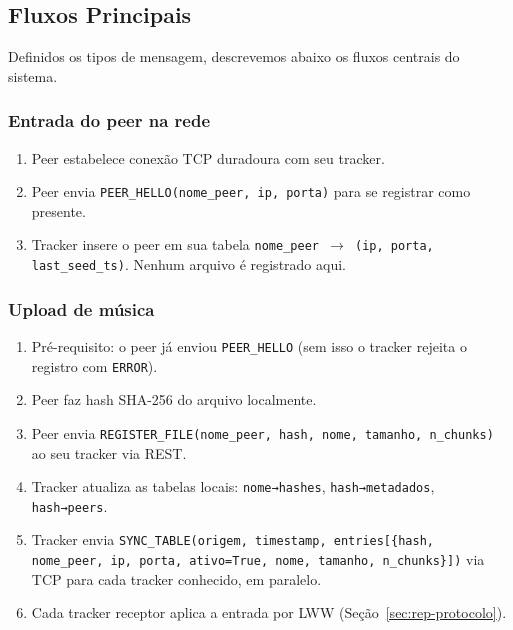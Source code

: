 \documentclass[12pt, a4paper]{article}
\begin{document}
\subsection{Fluxos Principais}\label{sec:fluxos}

Definidos os tipos de mensagem, descrevemos abaixo os fluxos centrais do sistema.

\subsubsection*{Entrada do peer na rede}
\begin{enumerate}
    \item Peer estabelece conexão TCP duradoura com seu tracker.
    \item Peer envia \texttt{PEER\_HELLO(nome\_peer, ip, porta)} para se registrar como presente.
    \item Tracker insere o peer em sua tabela \texttt{nome\_peer $\rightarrow$ (ip, porta, last\_seed\_ts)}. Nenhum arquivo é registrado aqui.
\end{enumerate}

\subsubsection*{Upload de música}
\begin{enumerate}
    \item Pré-requisito: o peer já enviou \texttt{PEER\_HELLO} (sem isso o tracker rejeita o registro com \texttt{ERROR}).
    \item Peer faz hash SHA-256 do arquivo localmente.
    \item Peer envia \texttt{REGISTER\_FILE(nome\_peer, hash, nome, tamanho, n\_chunks)} ao seu tracker via REST.
    \item Tracker atualiza as tabelas locais: \texttt{nome→hashes}, \texttt{hash→metadados}, \texttt{hash→peers}.
    \item Tracker envia \texttt{SYNC\_TABLE(origem, timestamp, entries[\{hash, nome\_peer, ip, porta, ativo=True, nome, tamanho, n\_chunks\}])} via TCP para cada tracker conhecido, em paralelo.
    \item Cada tracker receptor aplica a entrada por LWW (Seção~\ref{sec:rep-protocolo}).
\end{enumerate}
\end{document}
